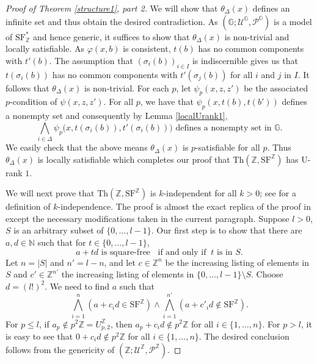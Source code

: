 \documentclass[letterpaper]{amsart}
\newcommand{\nn}{\mathbb{N}}
\newcommand{\zz}{\mathbb{Z}}
\renewcommand{\gg}{\mathbb{G}}
\newcommand{\sU}{\mathscr{U}}
\newcommand{\sP}{\mathscr{P}}
\newcommand{\SF}{\mathrm{SF}^\zz}
\newcommand{\TSFZ}{\mathrm{SF}^*_{\zz}}
\begin{document}
\begin{proof}[Proof of Theorem \ref{structure1}, part 2]
We will show that $\theta_{\Delta}(x)$ defines an infinite set and thus obtain the desired contradiction. As $(\gg; \sU^\gg, \sP^\gg)$ is a model of $ \TSFZ$ and hence generic, it suffices to show that $\theta_{\Delta}(x)$ is non-trivial and locally satisfiable. As $\varphi(x,b)$ is consistent, $t(b)$ has no common components with $t'(b)$.
The assumption  that $(\sigma_i(b))_{i \in I}$ is indiscernible gives us that $t(\sigma_i(b))$ has no common components with $t'(\sigma_j (b))$ for all $i$ and $j$ in $I$. It follows that $\theta_{\Delta}(x)$ is non-trivial. For each $p$, let  $\psi_p(x, z, z')$  be the associated $p$-condition of $\psi(x,z, z')$. For all $p$, we have that $\psi_p(x, t(b), t(b'))$ defines a nonempty set and consequently by Lemma \ref{localUrank1}, 
$$ \bigwedge_{i \in \Delta}\psi_p\big(x, t(\sigma_i(b)), t'(\sigma_i(b))\big) \text{ defines a nonempty set in } \gg.  $$
We easily check that the above means $\theta_\Delta(x)$ is $p$-satisfiable for all $p$. Thus $\theta_{\Delta}(x)$  is locally satisfiable which completes our proof that $\text{Th}(\zz, \SF)$ has U-rank $1$.

We will next prove that $\text{Th}(\zz, \SF)$ is $k$-independent for all $k>0$;  see \cite{CPT} for a definition of $k$-independence. The proof is almost the exact replica of the proof in \cite{ShelahKaplan} except the necessary modifications taken in the current paragraph. Suppose $l>0$, $S$ is an arbitrary subset of $\{ 0, \ldots, l-1\}$. Our first step is to show that there are $a, d \in \nn$ such that for $t \in \{0, \ldots, l-1\}$, 
$$a +td \text{ is square-free }\  \text{ if and only if }\  t \text{ is in } S.$$  Let $n= |S|$ and $n' = l -n$, and let $c \in \zz^n$ be the increasing listing of elements in $S$ and $c' \in \zz^{n'}$ the increasing listing of elements in $\{0, \ldots, l-1\}\setminus S$. Choose $d = (l!)^2$. We need to find $a$ such that 
$$ \bigwedge_{i=1}^n (a+ c_id \in \SF) \wedge \bigwedge_{i=1}^{n'} (a+ c'_id \notin \SF). $$
For $p\leq l$, if $a_p \notin p^2\zz = U_{p,2}^\zz$, then $a_p + c_id \notin p^2\zz$ for all $i \in \{1, \ldots, n\}$. For $p>l$, it is  easy to see that $ 0+  c_id \notin p^2\zz$ for all  $i \in \{1, \ldots, n\}$. The desired conclusion follows from the genericity of $(\zz; \sU^\zz, \sP^\zz)$.


\end{proof}
\end{document}
